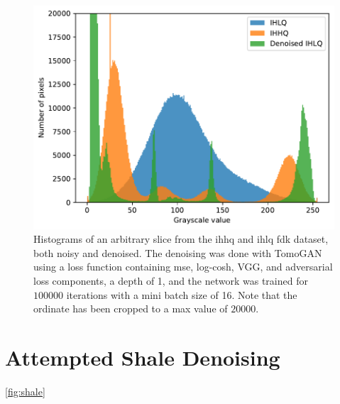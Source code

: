 \begin{figure}[htbp]
  \centering
  \includegraphics[width=.85\textwidth]{figures/kimroberthist.pdf}
  \caption[Histograms of IHHQ and IHLQ, noisy and denoised]{Histograms of an arbitrary slice from the \acrshort{ihhq} and \acrshort{ihlq} \acrshort{fdk} dataset, both noisy and denoised. The denoising was done with TomoGAN using a loss function containing \acrshort{mse}, log-cosh, VGG, and adversarial loss components, a depth of 1, and the network was trained for $100 000$ iterations with a mini batch size of 16. Note that the ordinate has been cropped to a max value of $20000$. }
  \label{fig:kimroberthist}
\end{figure}

\section{Attempted Shale Denoising}
\cref{fig:shale}

